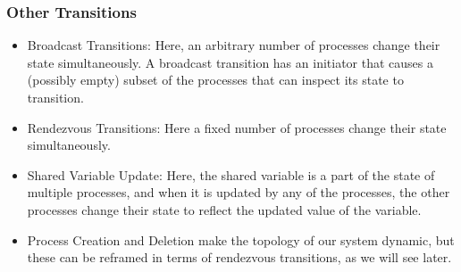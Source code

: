 \documentclass{beamer}
\begin{document}
{        \begin{frame}
            \frametitle{Other Transitions}
            \begin{itemize}
                \item Broadcast Transitions: Here, an arbitrary number of processes change their state simultaneously. 
                A broadcast transition has an initiator that causes a (possibly empty) subset of the processes that can inspect its state to transition.
                \item Rendezvous Transitions: Here a fixed number of processes change their state simultaneously. 
                \item Shared Variable Update: Here, the shared variable is a part of the state of multiple processes, and when it is updated by any of the 
                processes, the other processes change their state to reflect the updated value of the variable.
                \item Process Creation and Deletion make the topology of our system dynamic, but these can be reframed in terms of rendezvous transitions, as we 
                will see later.
            \end{itemize}
        \end{frame}
    }
\end{document}
